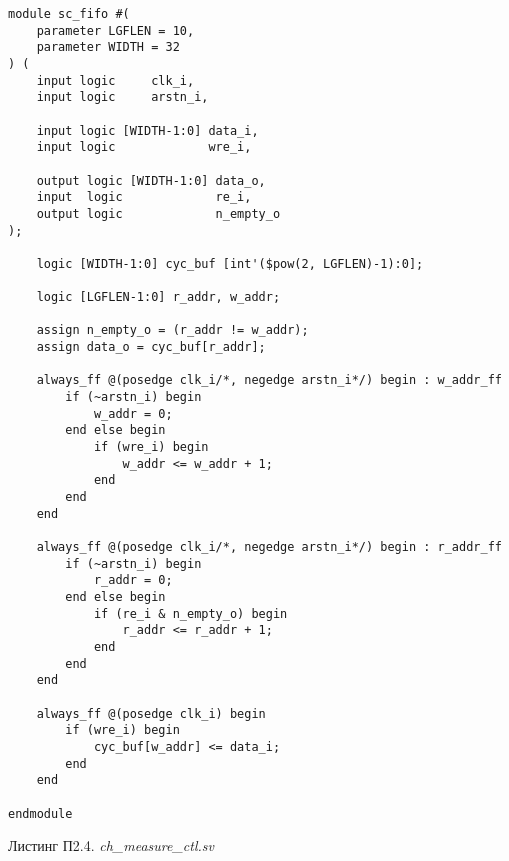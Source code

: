 \begin{lstlisting}
module sc_fifo #(
    parameter LGFLEN = 10,
    parameter WIDTH = 32
) (
    input logic     clk_i,
    input logic     arstn_i,

    input logic [WIDTH-1:0] data_i,
    input logic             wre_i,

    output logic [WIDTH-1:0] data_o,
    input  logic             re_i,
    output logic             n_empty_o
);

    logic [WIDTH-1:0] cyc_buf [int'($pow(2, LGFLEN)-1):0];

    logic [LGFLEN-1:0] r_addr, w_addr;

    assign n_empty_o = (r_addr != w_addr);
    assign data_o = cyc_buf[r_addr];

    always_ff @(posedge clk_i/*, negedge arstn_i*/) begin : w_addr_ff
        if (~arstn_i) begin
            w_addr = 0;
        end else begin
            if (wre_i) begin
                w_addr <= w_addr + 1;
            end
        end
    end

    always_ff @(posedge clk_i/*, negedge arstn_i*/) begin : r_addr_ff
        if (~arstn_i) begin
            r_addr = 0;
        end else begin
            if (re_i & n_empty_o) begin
                r_addr <= r_addr + 1;
            end
        end
    end

    always_ff @(posedge clk_i) begin
        if (wre_i) begin
            cyc_buf[w_addr] <= data_i;
        end
    end

endmodule
\end{lstlisting}

\begin{flushright}
Листинг П2.4. \emph{ch\_measure\_ctl.sv}
\end{flushright}

